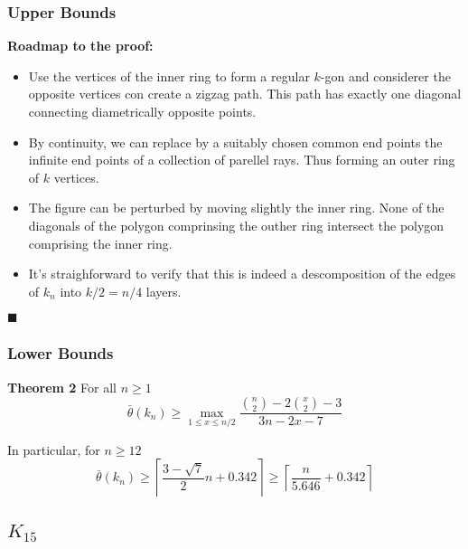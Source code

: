 \documentclass[12 pt]{beamer}
\begin{document}
\begin{frame}{}
    \frametitle{Upper Bounds}

    \textbf{Roadmap to the proof:}
    
    \begin{itemize}
        \item Use the vertices of the inner ring to form a regular $k$-gon and considerer the opposite vertices con create a zigzag path. This path has exactly one diagonal connecting diametrically opposite points. 
        
        \item By continuity, we can replace by a suitably chosen common end points the infinite end points of a collection of parellel rays. Thus forming an outer ring of $k$ vertices.
        
        \item The figure can be perturbed by moving slightly the inner ring. None of the diagonals of the polygon comprinsing the outher ring intersect the polygon comprising the inner ring.
        
        \item It's straighforward to verify that this is indeed a descomposition of the edges of $k_n$ into $k/2 = n/4$ layers.
    \end{itemize}
    
    \begin{flushright}
    $\blacksquare$
    \end{flushright}
\end{frame}


\begin{frame}{}
    \frametitle{Lower Bounds}
    
    \begin{block}{\textbf{Theorem 2}} 
    For all $n \geq 1$
    $$\bar{\theta} (k_{n}) \geq \max_{1 \leq x \leq n/2} \frac{\binom{n}{2} - 2\binom{x}{2} - 3}{3n - 2x - 7}$$
    \end{block}
    
    \pause
    
    \begin{exampleblock}{In particular, for $n \geq 12$}
    $$
    \bar{\theta} (k_{n}) \geq \left \lceil \frac{3 - \sqrt{7}}{2}n + 0.342 \right \rceil  \geq \left \lceil \frac{n}{5.646} + 0.342 \right  \rceil 
    $$
    \end{exampleblock}
\end{frame}

    \subsection{$K_{15}$}
    
\end{document}

